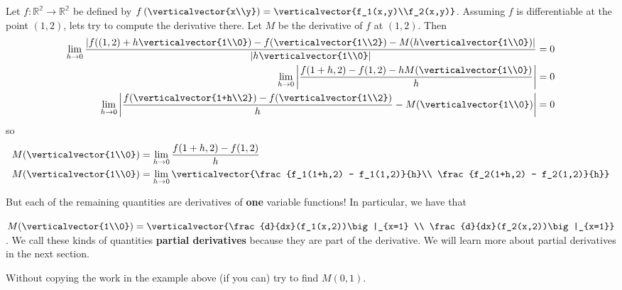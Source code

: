 \documentclass{ximera}
\begin{document}
\begin{example}
	Let $f:\mathbb{R^2} \to \mathbb{R^2}$ be defined by $f\left(\verticalvector{x\\y}\right) = \verticalvector{f_1(x,y)\\f_2(x,y)}$. 
	 Assuming $f$ is differentiable at the point $(1,2)$, lets try to compute the derivative there. 
	 Let $M$ be the derivative of $f$ at $(1,2)$.  Then 
	 \begin{align*}\displaystyle\lim_{h \to 0} \frac{\left|f((1,2)+h\verticalvector{1\\0}) - f(\verticalvector{1\\2}) - M(h\verticalvector{1\\0})\right|}{\left|h\verticalvector{1\\0}\right|} &= 0\\
	  \displaystyle\lim_{h \to 0}\left| \frac{f(1+h,2) - f(1,2) - hM(\verticalvector{1\\0})}{h} \right| &= 0\\
	  \displaystyle\lim_{h \to 0}\left| \frac{f(\verticalvector{1+h\\2}) - f(\verticalvector{1\\2})}{h} -M(\verticalvector{1\\0})\right| &= 0
	  \end{align*}
	  so
	  \begin{align*}
	  M(\verticalvector{1\\0}) &= \displaystyle\lim_{ h \to 0 } \frac{f(1+h,2) - f(1,2)}{h}\\
	  M(\verticalvector{1\\0}) &= \displaystyle\lim_{ h \to 0 } \verticalvector{\frac{f_1(1+h,2) - f_1(1,2)}{h}\\ \frac{f_2(1+h,2) - f_2(1,2)}{h}}
	 \end{align*}
	 
	 But each of the remaining quantities are derivatives of \textbf{one} variable functions!  In particular, we have that
	 
	 $M(\verticalvector{1\\0}) = \verticalvector{\frac{d}{dx}(f_1(x,2))\big|_{x=1} \\ \frac{d}{dx}(f_2(x,2))\big|_{x=1}}$.  
	 We call these kinds of quantities \textbf{partial derivatives}  because they are part of the derivative.  We will learn more about partial derivatives in the next section.
\end{example}

	Without copying the work in the example above (if you can) try to find $M(0,1)$.
	
\end{document}
